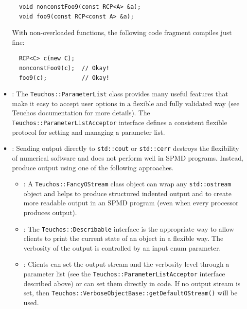 \begin{itemize}
{\small\begin{verbatim}
  void nonconstFoo9(const RCP<A> &a);
  void foo9(const RCP<const A> &a);
\end{verbatim}}

With non-overloaded functions, the following code fragment compiles just
fine:

{\small\begin{verbatim}
  RCP<C> c(new C);
  nonconstFoo9(c);  // Okay!
  foo9(c);          // Okay!
\end{verbatim}}

{}\item\GCGTeuchosParamterListAcceptor: The {}\texttt{Teuchos\-::Parameter\-List}
class provides many useful features that make it easy to accept user options
in a flexible and fully validated way (see Teuchos documentation for more
details).  The {}\texttt{Teuchos\-::Parameter\-List\-Acceptor} interface
defines a consistent flexible protocol for setting and managing a parameter
list.

{}\item\GCGStdStream: Sending output directly to {}\texttt{std\-::cout} or
{}\texttt{std\-::cerr} destroys the flexibility of numerical software and does
not perform well in SPMD programs.  Instead, produce output using one of the
following approaches.

\begin{itemize}

{}\item\GCGTeuchosFancyOStream: A {}\texttt{Teuchos\-::Fancy\-OStream} class object
can wrap any {}\texttt{std\-::ostream} object and helps to produce structured
indented output and to create more readable output in an SPMD program (even
when every processor produces output).

{}\item\GCGTeuchosDescribable: The {}\texttt{Teuchos\-::Describable} interface is
the appropriate way to allow clients to print the current state of an object
in a flexible way.  The verbosity of the output is controlled by an input enum
parameter.

{}\item\GCGTeuchosVerboseObject: Clients can set the output stream and the
verbosity level through a parameter list (see the
{}\texttt{Teuchos\-::ParameterListAcceptor} interface described above) or can
set them directly in code.  If no output stream is set, then
{}\texttt{Teuchos\-::Verbose\-Object\-Base\-::get\-Default\-OStream()} will be
used.


\end{itemize}
\end{itemize}
